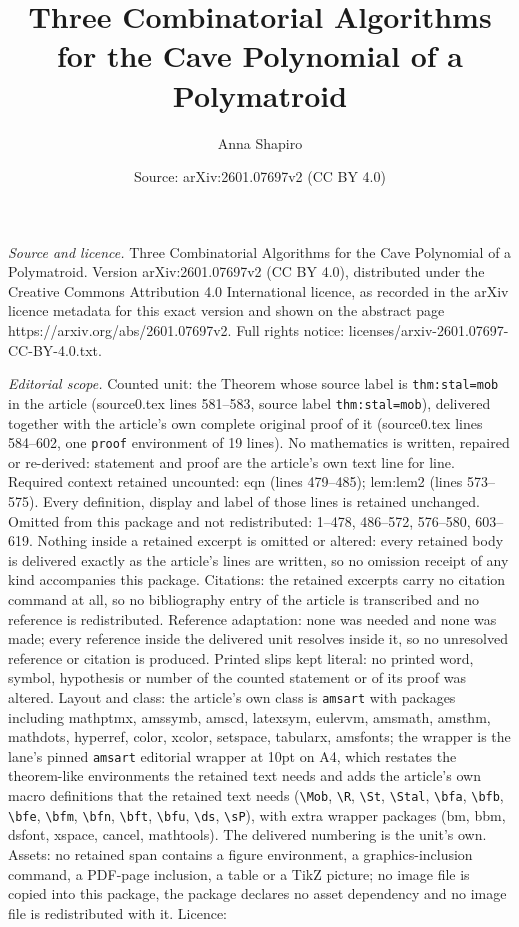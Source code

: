\documentclass[10pt,a4paper]{amsart}
\title[Three Combinatorial Algorithms for the Cave Polynomial of a ]{Three Combinatorial Algorithms for the Cave Polynomial of a Polymatroid}
\author{Anna Shapiro}
\date{Source: arXiv:2601.07697v2 (CC BY 4.0)}
\begin{document}
\maketitle

\noindent\emph{Source and licence.} Three Combinatorial Algorithms for the Cave Polynomial of a Polymatroid. Version arXiv:2601.07697v2 (CC BY 4.0), distributed under the Creative Commons Attribution 4.0 International licence, as recorded in the arXiv licence metadata for this exact version and shown on the abstract page https://arxiv.org/abs/2601.07697v2. Full rights notice: licenses/arxiv-2601.07697-CC-BY-4.0.txt.\par\smallskip

\noindent\textit{Editorial scope.} Counted unit: the Theorem whose source label is \texttt{thm:stal=mob} in the article (source0.tex lines 581--583, source label \texttt{thm:stal=mob}), delivered together with the article's own complete original proof of it (source0.tex lines 584--602, one \texttt{proof} environment of 19 lines). No mathematics is written, repaired or re-derived: statement and proof are the article's own text line for line. Required context retained uncounted: eqn (lines 479--485); lem:lem2 (lines 573--575). Every definition, display and label of those lines is retained unchanged. Omitted from this package and not redistributed: 1--478, 486--572, 576--580, 603--619. Nothing inside a retained excerpt is omitted or altered: every retained body is delivered exactly as the article's lines are written, so no omission receipt of any kind accompanies this package. Citations: the retained excerpts carry no citation command at all, so no bibliography entry of the article is transcribed and no reference is redistributed. Reference adaptation: none was needed and none was made; every reference inside the delivered unit resolves inside it, so no unresolved reference or citation is produced. Printed slips kept literal: no printed word, symbol, hypothesis or number of the counted statement or of its proof was altered. Layout and class: the article's own class is \texttt{amsart} with packages including mathptmx, amssymb, amscd, latexsym, eulervm, amsmath, amsthm, mathdots, hyperref, color, xcolor, setspace, tabularx, amsfonts; the wrapper is the lane's pinned \texttt{amsart} editorial wrapper at 10pt on A4, which restates the theorem-like environments the retained text needs and adds the article's own macro definitions that the retained text needs (\texttt{\textbackslash Mob}, \texttt{\textbackslash R}, \texttt{\textbackslash St}, \texttt{\textbackslash Stal}, \texttt{\textbackslash bfa}, \texttt{\textbackslash bfb}, \texttt{\textbackslash bfe}, \texttt{\textbackslash bfm}, \texttt{\textbackslash bfn}, \texttt{\textbackslash bft}, \texttt{\textbackslash bfu}, \texttt{\textbackslash ds}, \texttt{\textbackslash sP}), with extra wrapper packages (bm, bbm, dsfont, xspace, cancel, mathtools). The delivered numbering is the unit's own. Assets: no retained span contains a figure environment, a graphics-inclusion command, a PDF-page inclusion, a table or a TikZ picture; no image file is copied into this package, the package declares no asset dependency and no image file is redistributed with it. Licence: 
\end{document}
